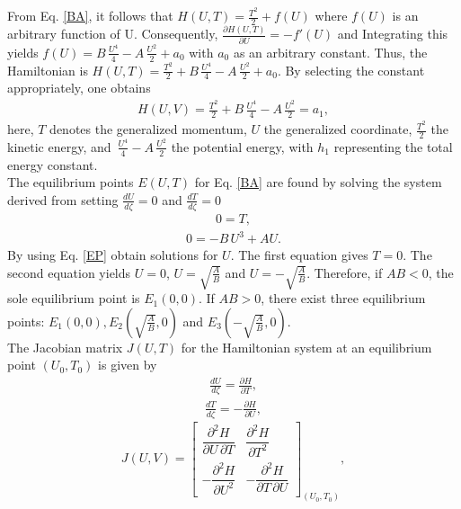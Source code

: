 \documentclass{article}
\numberwithin{equation}{section}
\begin{document}
From Eq. \ref{BA}, it follows that $H(U, T)=\frac{T^2}{2}+f(U)$ where $f(U)$ is an arbitrary function of U. Consequently, $\frac{\partial H(U,T)}{\partial U} =-f'(U)$ and Integrating this yields $f(U)=B\,\frac{U^4}{4}-A\,\frac{U^2}{2}+a_{0}$ with $a_{0}$ as an arbitrary constant. Thus, the Hamiltonian is $H(U, T) = \frac{T^2}{2}+B\,\frac{U^4}{4}-A\,\frac{U^2}{2}+a_{0}$. By selecting the constant appropriately, one obtains\\
\begin{eqnarray}
H(U, V) = \frac{T^2}{2}+B\,\frac{U^4}{4}-A\,\frac{U^2}{2}=a_{1},
\end{eqnarray}
here, $T$ denotes the generalized momentum, $U$ the generalized coordinate, $\frac{T^2}{2}$ the kinetic energy, and $\,\frac{U^4}{4}-A\,\frac{U^2}{2}$ the potential energy, with $h_{1}$ representing the total energy constant.\\
The equilibrium points $E(U, T)$ for Eq. \ref{BA} are found by solving the system derived from setting $\frac{d U}{d \zeta}= 0$ and $\frac{d T}{d \zeta} = 0$
\begin{eqnarray}\label{EP}
0 = T,\nonumber
\end{eqnarray}
\begin{eqnarray}
0 = -B \,U^{3}+A U.
\end{eqnarray}
By using Eq. \ref{EP} obtain solutions for $U$. The first equation gives $T = 0$. The second equation yields $U=0$, $U=\sqrt{\frac{A}{B}}$ and $U=-\sqrt{\frac{A}{B}}$. Therefore, if $AB < 0$, the sole equilibrium point is $E_{1}(0, 0)$. If $AB > 0$, there exist three equilibrium points: $E_{1}(0, 0), E_{2}(\sqrt{\frac{A}{B}},0)$ and $E_{3}(-\sqrt{\frac{A}{B}}, 0)$.\\
The Jacobian matrix $J(U, T)$ for the Hamiltonian system at an equilibrium point $(U_{0},T_{0})$ is given by
\begin{eqnarray}
\frac{d U}{d \zeta} = \frac{\partial H}{\partial T},
\end{eqnarray}
\begin{eqnarray}
\frac{d T}{d \zeta} = -\frac{\partial H}{\partial U},
\end{eqnarray}
\begin{equation}
J(U, V) =
\begin{bmatrix}
\dfrac{\partial^2 H}{\partial U \, \partial T} & \dfrac{\partial^2 H}{\partial T^2} \\[8pt]
-\dfrac{\partial^2 H}{\partial U^2} & -\dfrac{\partial^2 H}{\partial T \, \partial U}
\end{bmatrix}_{(U_0, T_0)},
\end{equation}
\end{document}

